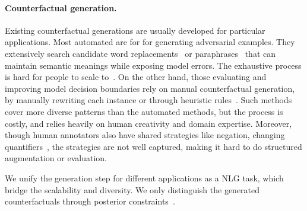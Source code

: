 \paragraph{Counterfactual generation.}
Existing counterfactual generations are usually developed for particular applications.
Most automated are for for generating adversarial examples. 
They extensively search candidate word replacements~\cite{alzantot2018generating, garg2020bae, alzantot2018generating, andreas2019good} or paraphrases~\cite{iyyer2018adversarial, malandrakis-etal-2019-controlled} that can maintain semantic meanings while exposing model errors.
The exhaustive process is hard for people to scale to~\cite{ribeiro2018sear}.
On the other hand, those evaluating and improving model decision boundaries rely on manual counterfactual generation, by manually rewriting each instance or through heuristic rules~\cite{Geiger2019PosingFG, li2020linguistically, jiang2019avoiding}.
Such methods cover more diverse patterns than the automated methods, but the process is costly, and relies heavily on human creativity and domain expertise.
Moreover, though human annotators also have shared strategies like negation, changing quantifiers~\cite{kaushik2019learning, gardner2020contrast}, the strategies are not well captured, making it hard to do structured augmentation or evaluation.

We unify the generation step for different applications as a NLG task, which bridge the scalability and diversity.
We only distinguish the generated counterfactuals through posterior constraints~\cite{morris2020textattack, alzantot-etal-2018-generating}.














